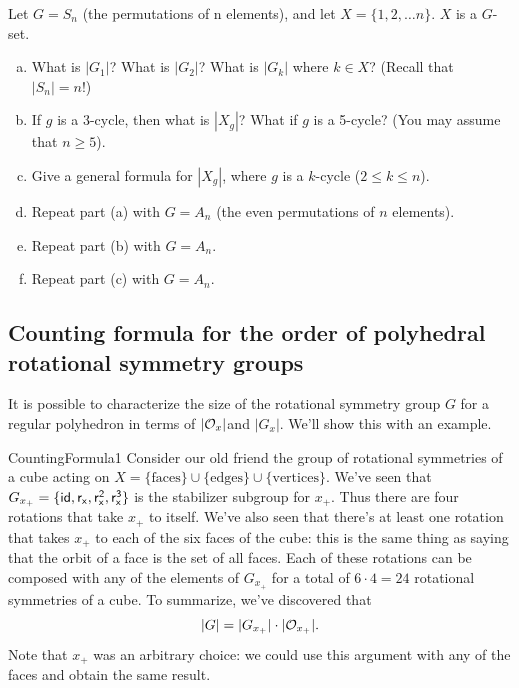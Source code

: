 \begin{exercise}{}
Let $G = S_n$ (the permutations of n elements), and let $X = \{1,2,\ldots n \}$.  $X$ is a $G$-set.
\begin{enumerate}[(a)]
\item
What is $|G_1|$? What is $|G_2|$? What is $|G_k|$ where $k \in X$?  (Recall that $|S_n| = n!$)
\item
If $g$ is a $3$-cycle, then what is $|X_g|$? What if $g$  is a 5-cycle?  (You may assume that $n \ge 5$).
\item
Give a general formula for $|X_g|$, where $g$ is a $k$-cycle ($2 \le k \le n$).
\item
Repeat part (a) with $G = A_n$ (the even permutations of $n$ elements).
\item
Repeat part (b) with $G = A_n$.
\item
Repeat part (c) with $G = A_n$.
\end{enumerate}
\end{exercise}


\subsection{Counting formula for the order of  polyhedral rotational symmetry groups}

It is possible to characterize the size of the rotational symmetry group $G$ for a regular polyhedron in terms of $|{\cal O}_x|$and $|G_x|$. We'll show this with an example.

\begin{example}{CountingFormula1} 
Consider our old friend the group of rotational symmetries of a cube acting on $X=\{\text{faces}\}\cup\{\text{edges}\}\cup\{\text{vertices}\}$. We've seen that $G_{x_+}=\{\sf{id},r_x,r_x^2,r_x^3\}$ is the stabilizer subgroup for $x_+$.  Thus there are four rotations that take $x_+$ to itself.  We've also seen that there's at least one rotation that takes $x_+$ to each of the six faces of the cube:  this is the same thing as saying that the orbit of a face is the set of all faces.  Each of these rotations can be composed with any of the elements of $G_{x_+}$ for a total of $6\cdot 4=24$ rotational symmetries of a cube.  To summarize, we've discovered that 
$$|G|=|G_{x_+}|\cdot |{\cal O}_{x_+}|.$$
Note that $x_+$ was an arbitrary choice: we could use this argument with any of the faces and obtain the same result.
\end{example}

